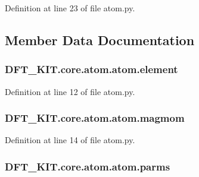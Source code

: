Definition at line 23 of file atom.\+py.



\subsection{Member Data Documentation}
\hypertarget{class_d_f_t___k_i_t_1_1core_1_1atom_1_1atom_a816b1396ea4ca88a59a76983227859b6}{
\subsubsection[{element}]{\setlength{\rightskip}{0pt plus 5cm}D\+F\+T\+\_\+\+K\+I\+T.\+core.\+atom.\+atom.\+element}}\label{class_d_f_t___k_i_t_1_1core_1_1atom_1_1atom_a816b1396ea4ca88a59a76983227859b6}


Definition at line 12 of file atom.\+py.

\hypertarget{class_d_f_t___k_i_t_1_1core_1_1atom_1_1atom_a60468fdb9054f8921592ffd376e5273e}{
\subsubsection[{magmom}]{\setlength{\rightskip}{0pt plus 5cm}D\+F\+T\+\_\+\+K\+I\+T.\+core.\+atom.\+atom.\+magmom}}\label{class_d_f_t___k_i_t_1_1core_1_1atom_1_1atom_a60468fdb9054f8921592ffd376e5273e}


Definition at line 14 of file atom.\+py.

\hypertarget{class_d_f_t___k_i_t_1_1core_1_1atom_1_1atom_aa864e96171a072d68ca20e3fcd8665dc}{
\subsubsection[{parms}]{\setlength{\rightskip}{0pt plus 5cm}D\+F\+T\+\_\+\+K\+I\+T.\+core.\+atom.\+atom.\+parms}}\label{class_d_f_t___k_i_t_1_1core_1_1atom_1_1atom_aa864e96171a072d68ca20e3fcd8665dc}


